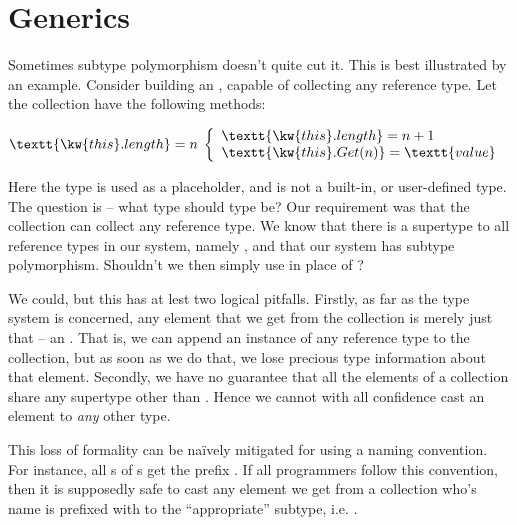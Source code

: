 \chapter{Generics}

%

Sometimes subtype polymorphism doesn't quite cut it. This is best illustrated
by an example. Consider building an , capable of
collecting any reference type. Let the collection have the following methods:

\begin{codebox}
\end{codebox}

\begin{codebox}
\zi {} $\textt{\kw{this}.length} = n$
\zi {} $\left\{
\begin{array}{l}
\textt{\kw{this}.length} = n + 1\\
\textt{\kw{this}.Get(n)} = \textt{value}
\end{array}
\right.$
\end{codebox}

\begin{codebox}
\end{codebox}

Here the type  is used as a placeholder, and is not a built-in, or
user-defined type.  The question is -- what type should type  be? Our
requirement was that the collection can collect any reference type. We know
that there is a supertype to all reference types in our system, namely
, and that our system has subtype polymorphism.  Shouldn't we then
simply use  in place of ?

We could, but this has at lest two logical pitfalls. Firstly, as far as the
type system is concerned, any element that we get from the collection is merely
just that -- an . That is, we can append an instance of any
reference type to the collection, but as soon as we do that, we lose precious
type information about that element. Secondly, we have no guarantee that all
the elements of a collection share any supertype other than .
Hence we cannot with all confidence cast an element to \emph{any} other type.

This loss of formality can be na\"ively mitigated for using a naming
convention. For instance, all s of s get
the prefix . If all programmers follow this convention,
then it is supposedly safe to cast any element we get from a collection who's
name is prefixed with  to the ``appropriate'' subtype,
i.e. .

